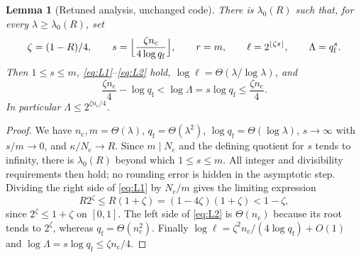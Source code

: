 \documentclass[11pt]{article}
\newtheorem{lemma}[theorem]{Lemma}
\theoremstyle{definition}\newtheorem{definition}[theorem]{Definition}
\theoremstyle{remark}\newtheorem{remark}[theorem]{Remark}
\begin{document}
\begin{lemma}[Retuned analysis, unchanged code]\label{lem:retune}
There is \(\lambda_0(R)\) such that, for every \(\lambda\ge\lambda_0(R)\), set
\[
 \zeta=(1-R)/4,\qquad s=\Bigl\lfloor\frac{\zeta n_{\mathrm c}}{4\log q_{\mathrm f}}\Bigr\rfloor,\qquad r=m,\qquad\ell=2^{\lfloor\zeta s\rfloor},\qquad\Lambda=q_{\mathrm f}^s.
\]
Then \(1\le s\le m\), \eqref{eq:L1}--\eqref{eq:L2} hold, \(\log\ell=\Theta(\lambda/\log\lambda)\), and
\[
 \frac{\zeta n_{\mathrm c}}4-\log q_{\mathrm f}<\log\Lambda=s\log q_{\mathrm f}\le\frac{\zeta n_{\mathrm c}}4.
\]
In particular \(\Lambda\le2^{\zeta n_{\mathrm c}/4}\).
\end{lemma}
\begin{proof}
We have \(n_{\mathrm c},m=\Theta(\lambda)\), \(q_{\mathrm f}=\Theta(\lambda^2)\), \(\log q_{\mathrm f}=\Theta(\log\lambda)\), \(s\to\infty\) with \(s/m\to0\), and \(\kappa/N_{\mathrm c}\to R\). Since \(m\mid N_{\mathrm c}\) and the defining quotient for \(s\) tends to infinity, there is \(\lambda_0(R)\) beyond which \(1\le s\le m\). All integer and divisibility requirements then hold; no rounding error is hidden in the asymptotic step. Dividing the right side of \eqref{eq:L1} by \(N_{\mathrm c}/m\) gives the limiting expression
\[
 R2^\zeta\le R(1+\zeta)=(1-4\zeta)(1+\zeta)<1-\zeta,
\]
since \(2^\zeta\le1+\zeta\) on \([0,1]\). The left side of \eqref{eq:L2} is \(\Theta(n_{\mathrm c})\) because its root tends to \(2^\zeta\), whereas \(q_{\mathrm f}=\Theta(n_{\mathrm c}^2)\). Finally \(\log\ell=\zeta^2n_{\mathrm c}/(4\log q_{\mathrm f})+O(1)\) and \(\log\Lambda=s\log q_{\mathrm f}\le\zeta n_{\mathrm c}/4\).
\end{proof}
\end{document}

